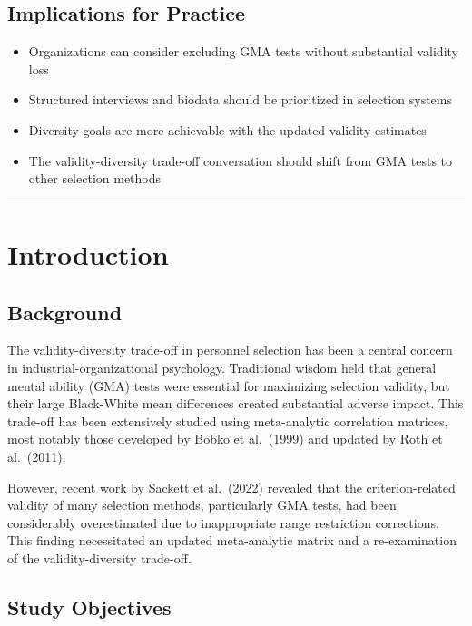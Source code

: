 \documentclass[
]{article}
\providecommand{\tightlist}{%
  \setlength{\itemsep}{0pt}\setlength{\parskip}{0pt}}
\begin{document}
\subsection{Implications for Practice}\label{implications-for-practice}

\begin{itemize}
\tightlist
\item
  Organizations can consider excluding GMA tests without substantial
  validity loss
\item
  Structured interviews and biodata should be prioritized in selection
  systems
\item
  Diversity goals are more achievable with the updated validity
  estimates
\item
  The validity-diversity trade-off conversation should shift from GMA
  tests to other selection methods
\end{itemize}

\begin{center}\rule{0.5\linewidth}{0.5pt}\end{center}

\section{Introduction}\label{introduction}

\subsection{Background}\label{background}

The validity-diversity trade-off in personnel selection has been a
central concern in industrial-organizational psychology. Traditional
wisdom held that general mental ability (GMA) tests were essential for
maximizing selection validity, but their large Black-White mean
differences created substantial adverse impact. This trade-off has been
extensively studied using meta-analytic correlation matrices, most
notably those developed by Bobko et al.~(1999) and updated by Roth et
al.~(2011).

However, recent work by Sackett et al.~(2022) revealed that the
criterion-related validity of many selection methods, particularly GMA
tests, had been considerably overestimated due to inappropriate range
restriction corrections. This finding necessitated an updated
meta-analytic matrix and a re-examination of the validity-diversity
trade-off.

\subsection{Study Objectives}\label{study-objectives}
\end{document}
